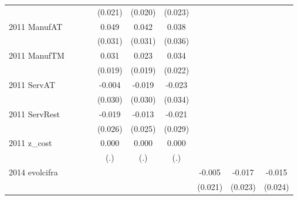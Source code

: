 \begin{table}[htbp]
\begin{tabular}{l*{9}{c}}
                    &               &               &               &     (0.021)   &     (0.020)   &     (0.023)   &               &               &               \\
2011 ManufAT        &               &               &               &       0.049   &       0.042   &       0.038   &               &               &               \\
                    &               &               &               &     (0.031)   &     (0.031)   &     (0.036)   &               &               &               \\
2011 ManufTM        &               &               &               &       0.031   &       0.023   &       0.034   &               &               &               \\
                    &               &               &               &     (0.019)   &     (0.019)   &     (0.022)   &               &               &               \\
2011 ServAT         &               &               &               &      -0.004   &      -0.019   &      -0.023   &               &               &               \\
                    &               &               &               &     (0.030)   &     (0.030)   &     (0.034)   &               &               &               \\
2011 ServRest       &               &               &               &      -0.019   &      -0.013   &      -0.021   &               &               &               \\
                    &               &               &               &     (0.026)   &     (0.025)   &     (0.029)   &               &               &               \\
2011 z\_cost         &               &               &               &       0.000   &       0.000   &       0.000   &               &               &               \\
                    &               &               &               &         (.)   &         (.)   &         (.)   &               &               &               \\
2014 evolcifra      &               &               &               &               &               &               &      -0.005   &      -0.017   &      -0.015   \\
                    &               &               &               &               &               &               &     (0.021)   &     (0.023)   &     (0.024)   \\

\end{tabular}
\end{table}
